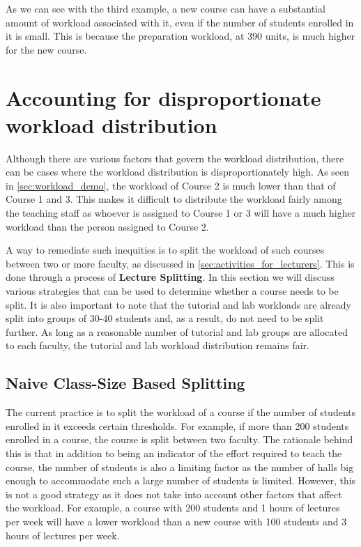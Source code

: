 As we can see with the third example, a new course can have a substantial amount of workload associated with it, even if the number of students enrolled in it is small. This is because the preparation workload, at 390 units, is much higher for the new course.


\section{Accounting for disproportionate workload distribution}

Although there are various factors that govern the workload distribution, there can be cases where the workload distribution is disproportionately high. As seen in \autoref{sec:workload_demo}, the workload of Course 2 is much lower than that of Course 1 and 3. This makes it difficult to distribute the workload fairly among the teaching staff as whoever is assigned to Course 1 or 3 will have a much higher workload than the person assigned to Course 2.

A way to remediate such inequities is to split the workload of such courses between two or more faculty, as discussed in \autoref{sec:activities_for_lecturers}. This is done through a process of \textbf{Lecture Splitting}. In this section we will discuss various strategies that can be used to determine whether a course needs to be split. It is also important to note that the tutorial and lab workloads are already split into groups of 30-40 students and, as a result, do not need to be split further. As long as a reasonable number of tutorial and lab groups are allocated to each faculty, the tutorial and lab workload distribution remains fair.

\subsection{Naive Class-Size Based Splitting}

The current practice is to split the workload of a course if the number of students enrolled in it exceeds certain thresholds. For example, if more than 200 students enrolled in a course, the course is split between two faculty. The rationale behind this is that in addition to being an indicator of the effort required to teach the course, the number of students is also a limiting factor as the number of halls big enough to accommodate such a large number of students is limited. However, this is not a good strategy as it does not take into account other factors that affect the workload. For example, a course with 200 students and 1 hours of lectures per week will have a lower workload than a new course with 100 students and 3 hours of lectures per week.

